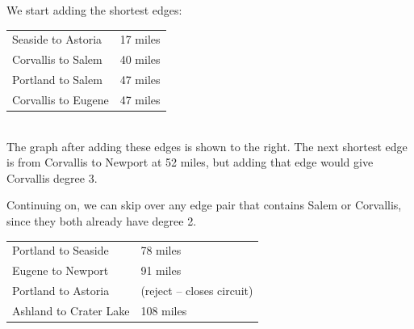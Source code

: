 \begin{example}{}{}
\begin{minipage}{0.5\textwidth}
We start adding the shortest edges:\\
\begin{tabular}{ll}
Seaside to Astoria&	17 miles\\
Corvallis to Salem	&40 miles\\
Portland to Salem	&47 miles\\
Corvallis to Eugene	&47 miles\\
\end{tabular}\\

The graph after adding these edges is shown to the right.   The next shortest edge is from Corvallis to Newport at 52 miles, but adding that edge would give Corvallis degree 3.  \\
\end{minipage}
%
\begin{minipage}{0.5\textwidth}
\end{minipage}

\begin{minipage}{0.5\textwidth}
Continuing on, we can skip over any edge pair that contains Salem or Corvallis, since they both already have degree 2.\\
\begin{tabular}{ll}
Portland to Seaside& 		78 miles\\
Eugene to Newport	&	91 miles\\
Portland to Astoria	&	(reject -- closes circuit)\\
Ashland to Crater Lake	&108 miles\\
\end{tabular}\\


\end{minipage}
\end{example}
